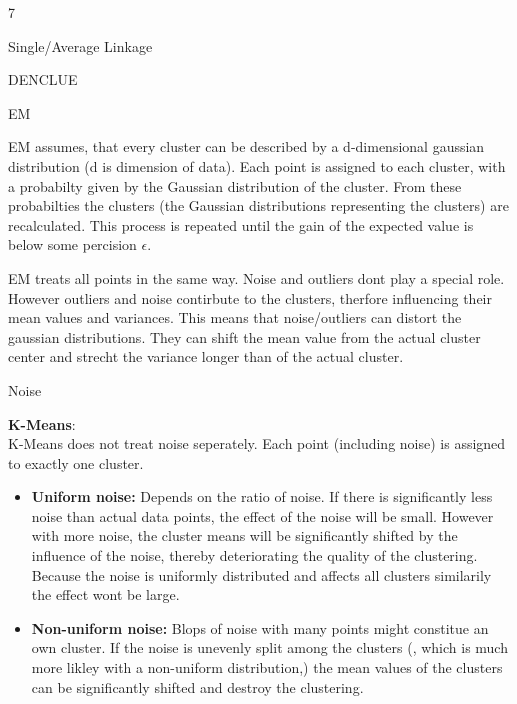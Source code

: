 \documentclass{article}
\begin{document}
    \begin{ukon-infie}[12.12.17]{7}

        \begin{exercise}[p=7]{Single/Average Linkage}      

		\end{exercise}
		
		\begin{exercise}[p=2]{DENCLUE}

		\end{exercise}
		
		\begin{exercise}[p=7]{EM}
		
		\question{}
		{
			EM assumes, that every cluster can be described by a d-dimensional gaussian distribution (d is dimension of data). Each point is assigned to each cluster, with a probabilty given by the Gaussian distribution of the cluster. From these probabilties the clusters (the Gaussian distributions representing the clusters) are recalculated. This process is repeated until the gain of the expected value is below some percision $\epsilon$.
		}
		
		\question{}
		{
			EM treats all points in the same way. Noise and outliers dont play a special role.\\
			However outliers and noise contirbute to the clusters, therfore influencing their mean values and variances. This means that noise/outliers can distort the gaussian distributions. They can shift the mean value from the actual cluster center and strecht the variance longer than of the actual cluster.
		}
		
		
		
	
		\end{exercise}
		
		\begin{exercise}[p=3]{Noise}
		
			\textbf{K-Means}:\\
			K-Means does not treat noise seperately. Each point (including noise) is assigned to exactly one cluster.\\
				\begin{itemize}
				 \item \textbf{Uniform noise:} Depends on the ratio of noise. If there is significantly less noise than actual data points, the effect of the noise will be small. However with more noise, the cluster means will be significantly shifted by the influence of the noise, thereby deteriorating the quality of the clustering. Because the noise is uniformly distributed and affects all clusters similarily the effect wont be large.
				 \item \textbf{Non-uniform noise:} Blops of noise with many points might constitue an own cluster. If the noise is unevenly split among the clusters (, which is much more likley with a non-uniform distribution,) the mean values of the clusters can be significantly shifted and destroy the clustering.
				\end{itemize}
				

\end{exercise}
\end{ukon-infie}
\end{document}
